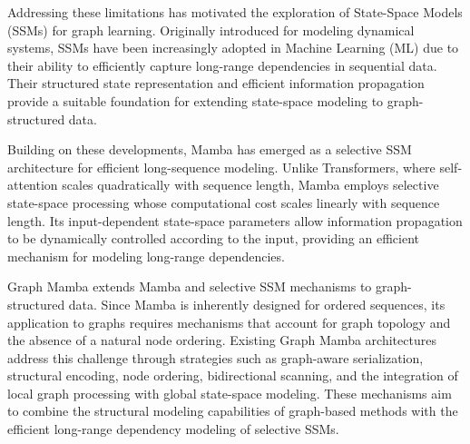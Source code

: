 \documentclass[acmsmall]{acmart}
\begin{document}
Addressing these limitations has motivated the exploration of State-Space
Models (SSMs) \cite{gu2021efficiently} for graph learning. Originally
introduced for modeling dynamical systems, SSMs have been increasingly adopted
in Machine Learning (ML) due to their ability to efficiently capture long-range
dependencies in sequential data. Their structured state representation and
efficient information propagation provide a suitable foundation for extending
state-space modeling to graph-structured data.

Building on these developments, Mamba \cite{gu2023mamba} has emerged as a
selective SSM architecture for efficient long-sequence modeling. Unlike
Transformers, where self-attention scales quadratically with sequence length,
Mamba employs selective state-space processing whose computational cost scales
linearly with sequence length. Its
input-dependent state-space parameters allow information propagation to be
dynamically controlled according to the input, providing an efficient mechanism
for modeling long-range dependencies.

Graph Mamba extends Mamba and selective SSM mechanisms to graph-structured
data. Since Mamba is inherently designed for ordered sequences, its application
to graphs requires mechanisms that account for graph topology and the absence
of a natural node ordering. Existing Graph Mamba architectures address this
challenge through strategies such as graph-aware serialization, structural
encoding, node ordering, bidirectional scanning, and the integration of local
graph processing with global state-space modeling. These mechanisms aim to
combine the structural modeling capabilities of graph-based methods with the
efficient long-range dependency modeling of selective SSMs.
\end{document}
